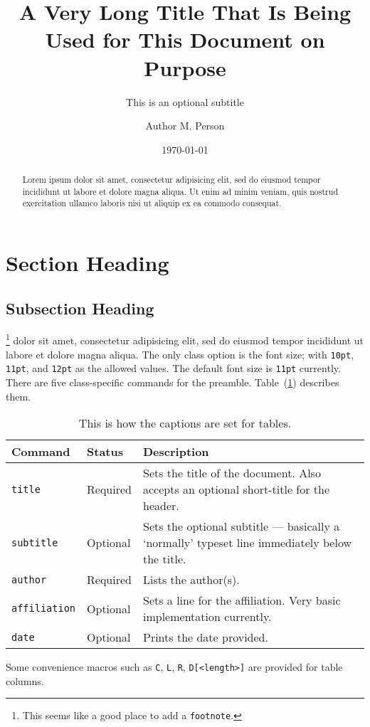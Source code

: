 \documentclass[11pt]{salam}
\title[Title for the Header]{A Very Long Title That Is Being Used for This Document on Purpose}
\subtitle{This is an optional subtitle}
\author{Author M. Person}
\affiliation{Some Affiliation, City}
\date{\today}
\begin{document}
\maketitle
\margintoc

\begin{abstract}
  Lorem ipsum dolor sit amet, consectetur adipisicing elit, sed do eiusmod tempor incididunt ut labore et dolore magna aliqua. Ut enim ad minim veniam, quis nostrud exercitation ullamco laboris nisi ut aliquip ex ea commodo consequat.
\end{abstract}

\section{Section Heading}
\subsection{Subsection Heading}
\footnote{This seems like a good place to add a \texttt{footnote}.} dolor sit amet, consectetur adipisicing elit, sed do eiusmod tempor incididunt ut labore et dolore magna aliqua. The only class option is the font size; with \texttt{10pt}, \texttt{11pt}, and \texttt{12pt} as the allowed values. The default font size is \texttt{11pt} currently. There are five class-specific commands for the preamble. Table~(\ref{tab:the-only-table}) describes them.
\begin{table}[h]
\centering
\begin{tabularx}{\linewidth}{p{20mm}p{15mm}X}
\toprule
Command & Status & Description\\
\midrule
\texttt{title} & Required & Sets the title of the document. Also accepts an optional short-title for the header.\\
\texttt{subtitle} & Optional & Sets the optional subtitle --- basically a `normally' typeset line immediately below the title.\\
\texttt{author} & Required & Lists the author(s).\\
\texttt{affiliation} & Optional & Sets a line for the affiliation. Very basic implementation currently.\\
\texttt{date} & Optional & Prints the date provided.\\
\bottomrule
\end{tabularx}
\caption{This is how the captions are set for tables.}
\label{tab:the-only-table}
\end{table}
Some convenience macros such as \texttt{C}, \texttt{L}, \texttt{R}, \texttt{D[<length>]} are provided for table columns.
\end{document}
